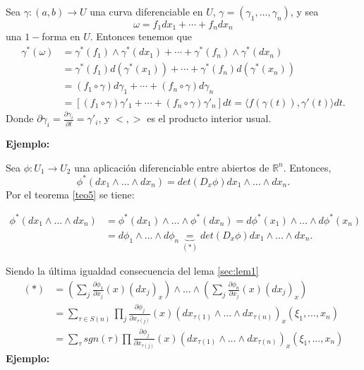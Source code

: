 Sea $\gamma : (a,b) \rightarrow U$ una curva diferenciable en $U$, $\gamma= (\gamma_1,\dots,\gamma_n)$, y sea
$$\omega=f_1dx_1+\cdots + f_ndx_n $$
una $1-$forma en $U$. Entonces tenemos que
\begin{equation}
  \begin{split}
    \gamma^*(\omega) &= \gamma^*(f_1) \wedge \gamma^*(dx_1)+\cdots + \gamma^*(f_n)\wedge \gamma^*(dx_n) \\
    &= \gamma^*(f_1)d(\gamma^*(x_1))+\cdots + \gamma^*(f_n)d(\gamma^*(x_n)) \\
    &= (f_1\circ \gamma)d\gamma_1 + \cdots + (f_n\circ \gamma) d\gamma_n \\
    &= [(f_1\circ \gamma)\gamma'_1+\cdots + (f_n\circ \gamma)\gamma'_n]dt = \langle f(\gamma(t)),\gamma'(t) \rangle dt.
  \end{split}
\end{equation}
Donde $\partial \gamma_i=\frac{\partial \gamma_i}{\partial t}=\gamma'_i$, y $<,>$ es el producto interior usual.


\textbf{Ejemplo:}

Sea $\phi:U_1\rightarrow U_2$ una aplicación diferenciable entre abiertos de $\mathbb{R}^n$. Entonces,
$$\phi^*(dx_1\wedge \dots \wedge dx_n)=det (D_x\phi)dx_1\wedge \dots \wedge dx_n. $$
Por el teorema \ref{teo5} se tiene:

\begin{equation}
  \begin{split}
    \phi^*(dx_1\wedge \dots \wedge dx_n) &= \phi^*(dx_1)\wedge \dots \wedge \phi^*(dx_n)=d\phi^*(x_1)\wedge \dots \wedge d\phi^*(x_n) \\
    &= d\phi_1 \wedge \dots \wedge d\phi_n\underbrace{=}_{(*)}det(D_x\phi)dx_1\wedge \dots \wedge dx_n.
  \end{split}
\end{equation}

Siendo la última igualdad consecuencia del lema \ref{sec:lem1}
\begin{equation}
  \begin{split}
    (*)&=(\sum_j \frac{\partial \phi_1}{\partial x_j}(x)(dx_j)_x)\wedge \dots \wedge (\sum_j \frac{\partial \phi_n}{\partial x_j}(x)(dx_j)_x) \\
    &= \sum_{\tau \in S(n)}\prod_j \frac{\partial \phi_j}{\partial x_{\tau (j)}}(x) (dx_{\tau(1)}\wedge \dots \wedge dx_{\tau(n)})_x(\xi_1,\dots,x_n) \\
    &= \sum_\tau sgn(\tau) \prod \frac{\partial \phi_j}{\partial x_{\tau (j)}}(x)(dx_{\tau(1)}\wedge \dots \wedge dx_{\tau(n)})_x(\xi_1,\dots,x_n)
\end{split}
\end{equation}
\textbf{Ejemplo:}

